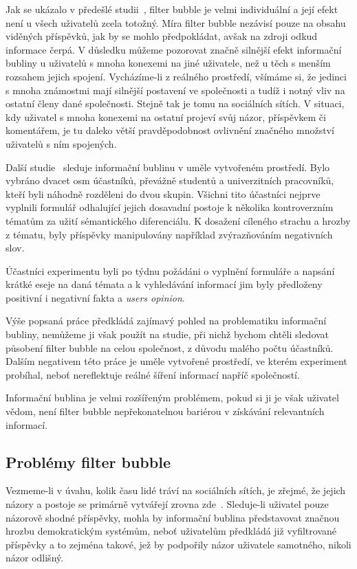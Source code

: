 \documentclass[12pt, a4paper]{article}
\numberwithin{equation}{section} 	%
\begin{document}
Jak se ukázalo v předešlé studii~\cite{TheImpactOfFilterBubble}, filter bubble je velmi individuální a její efekt není u všech uživatelů zcela totožný. Míra filter bubble nezávisí pouze na obsahu viděných příspěvků, jak by se mohlo předpokládat, avšak na zdroji odkud informace čerpá. V důsledku můžeme pozorovat značně silnější efekt informační bubliny u uživatelů s mnoha konexemi na jiné uživatele, než u těch s menším rozsahem jejich spojení. Vycházíme-li z reálného prostředí, všímáme si, že jedinci s mnoha známostmi mají silnější postavení ve společnosti a tudíž i notný vliv na ostatní členy dané společnosti. Stejně tak je tomu na sociálních sítích. V situaci, kdy uživatel s mnoha konexemi na ostatní projeví svůj názor, příspěvkem či komentářem, je tu daleko větší pravděpodobnost ovlivnění značného množství uživatelů s ním spojených.

Další studie~\cite{BeyondFilterBubble} sleduje informační bublinu v uměle vytvořeném prostředí. Bylo vybráno dvacet osm účastníků, převážně studentů a univerzitních pracovníků, kteří byli náhodně rozděleni do dvou skupin. Všichni tito účastníci nejprve vyplnili formulář odhalující jejich dosavadní postoje k několika kontroverzním tématům za užití sémantického diferenciálu. K dosažení cíleného strachu a hrozby z tématu, byly příspěvky manipulovány například zvýrazňováním negativních slov.

Účastníci experimentu byli po týdnu požádáni o vyplnění formuláře a napsání krátké eseje na daná témata a k vyhledávání informací jim byly předloženy positivní i negativní fakta a \textit{users opinion}.

Výše popsaná práce předkládá zajímavý pohled na problematiku informační bubliny, nemůžeme ji však použít na studie, při nichž bychom chtěli sledovat působení filter bubble na celou společnost, z důvodu malého počtu účastníků. Dalším negativem této práce je uměle vytvořené prostředí, ve kterém experiment probíhal, neboť nereflektuje reálné šíření informací napříč společností.

Informační bublina je velmi rozšířeným problémem, pokud si ji je však uživatel vědom, není filter bubble nepřekonatelnou bariérou v získávání relevantních informací.


\subsection{Problémy filter bubble}
Vezmeme-li v úvahu, kolik času lidé tráví na sociálních sítích, je zřejmé, že jejich názory a postoje se primárně vytvářejí zrovna zde~\cite{TheImpactOfFilterBubble, BeyondFilterBubble, whyNewsOnTwitter}. Sleduje-li uživatel pouze názorově shodné příspěvky, mohla by informační bublina před\-sta\-vo\-vat značnou hrozbu demokratickým systémům, neboť uživatelům předkládá již vyfiltrované příspěvky a to zejména takové, jež by podpořily názor uživatele samotného, nikoli názor odlišný.
\end{document}

